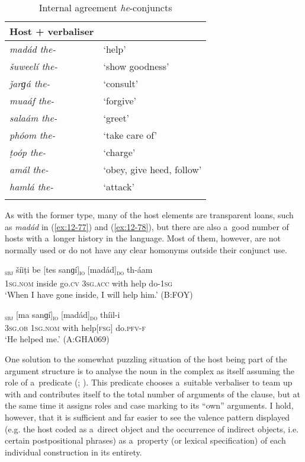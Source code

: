 \begin{table}[ht]
\caption{Internal agreement \textit{he}-conjuncts}
\begin{tabularx}{.75\textwidth}{ l@{\hspace{45pt}} Q} 
\lsptoprule
Host + verbaliser &
\\\hline
\textit{madád the-} &
`help'\\
\textit{šuweelí the-} &
`show goodness'\\
\textit{ǰarɡá the-} &
`consult'\\
\textit{muaáf the-} &
`forgive'\\
\textit{salaám the-} &
`greet'\\
\textit{phóom the-} &
`take care of'\\
\textit{ṭoóp the-} &
`charge'\\
\textit{amál the-} &
`obey, give heed, follow'\\
\textit{hamlá the-} &
`attack'\\\lspbottomrule
\end{tabularx}
\label{tab:12-4}
\end{table}


As with the former type, many of the host elements are transparent loans, such as \textit{madád} in (\ref{ex:12-77}) and (\ref{ex:12-78}), but there are also a~good number of hosts with a~longer history in the language. Most of them, however, are not normally used or do not have any clear homonyms outside their conjunct use.

\begin{exe}
\ex
\label{ex:12-77}
\gll [ma]\textsubscript{\textsc{sbj}} šíiṭi be [tes sanɡí]\textsubscript{\textsc{io}} [madád]\textsubscript{\textsc{do}} th-áam  \\
\textsc{1sg.nom} inside go.\textsc{cv} \textsc{3sg.acc} with help do-\textsc{1sg} \\
\glt `When I have gone inside, I will help him.' (B:FOY)
\end{exe}
\begin{exe}
\ex
\label{ex:12-78}
\gll [eetíi]\textsubscript{\textsc{sbj}} [ma sanɡí]\textsubscript{\textsc{io}} [madád]\textsubscript{\textsc{do}} thíil-i  \\
\textsc{3sg.ob} \textsc{1sg.nom} with help[\textsc{fsg]} do.\textsc{pfv-f}  \\
\glt `He helped me.' (A:GHA069)
\end{exe}

One solution to the somewhat puzzling situation of the host being part of the argument structure is to analyse the noun in the complex as itself assuming the role of a~predicate (\citealt[204--212]{verma1993}; \citealt[164--170]{mohanan1993}). This predicate chooses a~suitable verbaliser to team up with and contributes itself to the total number of arguments of the clause, but at the same time it assigns roles and case marking to its ``own'' arguments. I hold, however, that it is sufficient and far easier to see the valence pattern displayed (e.g. the host coded as a~direct object and the occurrence of indirect objects, i.e. certain postpositional phrases) as a~property (or lexical specification) of each individual construction in its entirety. 

